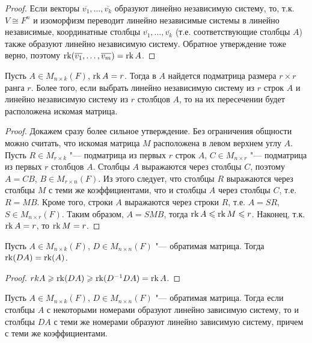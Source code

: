 \begin{proof}
	Если векторы $\overline{v_1}, \dots, \overline{v_k}$ образуют линейно независимую систему, то, т.\:к. $V \cong F^n$ и изоморфизм переводит линейно независимые системы в линейно независимые, координатные столбцы $\overline{v_1}, \dots, \overline{v_k}$ (т.\:е. соответствующие столбцы $A$) также образуют линейно независимую систему. Обратное утверждение тоже верно, поэтому $\rk(\overline{v_1}, \dots, \overline{v_m}) \hm{=} \rk{A}$.
\end{proof}

\begin{theorem}
	Пусть $A \in M_{n \times k}(F)$, $\operatorname{rk}{A} = r$. Тогда в $A$ найдется подматрица размера $r \times r$ ранга $r$. Более того, если выбрать линейно независимую систему из $r$ строк $A$ и линейно независимую систему из $r$ столбцов $A$, то на их пересечении будет расположена искомая матрица.
\end{theorem}

\begin{proof}
	Докажем сразу более сильное утверждение. Без ограничения общности можно считать, что искомая матрица $M$ расположена в левом верхнем углу $A$. Пусть $R \in M_{r \times k}$ "--- подматрица из первых $r$ строк $A$, $C \in M_{n \times r}$ "--- подматрица из первых $r$ столбцов $A$. Столбцы $A$ выражаются через столбцы $C$, поэтому $A = CB$, $B \in M_{r \times n}(F)$. Из этого следует, что столбцы $R$ выражаются через столбцы $M$ с теми же коэффициентами, что и столбцы $A$ через столбцы $C$, т.\:е. $R = MB$. Кроме того, строки $A$ выражаются через строки $R$, т.\:е. $A = SR$, $S \in M_{n \times r}(F)$. Таким образом, $A = SMB$, тогда $\operatorname{rk}{A} \leqslant \operatorname{rk}{M} \leqslant r$. Наконец, т.\:к. $\operatorname{rk}{A} = r$, то $\operatorname{rk}{M} = r$.
\end{proof}

\begin{proposition}
	Пусть $A \in M_{n \times k}(F)$, $D \in M_{n \times n}(F)$ "--- обратимая матрица. Тогда $\operatorname{rk}(DA) = \operatorname{rk}(A)$.
\end{proposition}

\begin{proof}
	$rk{A} \geqslant \operatorname{rk}(DA) \geqslant \operatorname{rk}(D^{-1}DA) = \operatorname{rk}{A}$.
\end{proof}

\begin{proposition}
	Пусть $A \in M_{n \times k}(F)$, $D \in M_{n \times n}(F)$ "--- обратимая матрица. Тогда если столбцы $A$ с некоторыми номерами образуют линейно зависимую систему, то и столбцы $DA$ с теми же номерами образуют линейно зависимую систему, причем с теми же коэффициентами.
\end{proposition}

